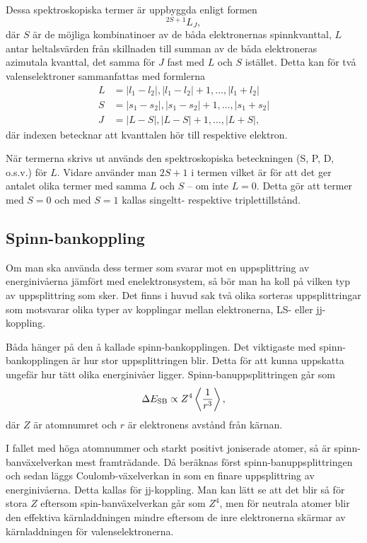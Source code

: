 \documentclass[11pt,a4paper]{article}
\begin{document}
Dessa spektroskopiska termer är uppbyggda enligt formen \cite{Bransden}
\[
^{2S+1}L_J,
\]
där $S$ är de möjliga kombinatinoer av de båda elektronernas
spinnkvanttal, $L$ antar heltalsvärden från skillnaden till summan av
de båda elektroneras azimutala kvanttal, det samma för $J$ fast med
$L$ och $S$ istället. Detta kan för två valenselektroner sammanfattas
med formlerna \cite{Bransden}
\begin{equation*}
\begin{aligned}
L &= |l_1-l_2|, |l_1- l_2|+1, \ldots, |l_1+l_2|\\
S &= |s_1-s_2|, |s_1- s_2|+1, \ldots, |s_1+s_2|\\
J &= |L-S|, |L-S| +1, \ldots, |L+S|,
\end{aligned}
\end{equation*}
där indexen betecknar att kvanttalen hör till respektive elektron.

När termerna skrivs ut används den spektroskopiska beteckningen (S, P,
D, o.s.v.) för $L$. Vidare använder man $2S+1$ i termen vilket är för
att det ger antalet olika termer med samma $L$ och $S$ -- om inte
$L=0$. Detta gör att termer med $S=0$ och med $S=1$ kallas singeltt-
respektive triplettillstånd. 

\subsection{Spinn-bankoppling}\label{sec:LS}
Om man ska använda dess termer som svarar mot en uppsplittring av energinivåerna
jämfört med enelektronsystem, så bör man ha koll på vilken typ av uppsplittring
som sker. Det finns i huvud sak två olika sorteras uppsplittringar som motsvarar
olika typer av kopplingar mellan elektronerna, LS- eller jj-koppling. 

Båda hänger på den å kallade spinn-bankopplingen. Det viktigaste med
spinn-bankopplingen är hur stor uppsplittringen blir. Detta för att kunna
uppskatta ungefär hur tätt olika energinivåer ligger. Spinn-banuppsplittringen
går som\cite{Bransden} 
\[
\Delta E_\text{SB} \propto Z^4 \ev{\frac{1}{r^3}},
\]
där $Z$ är atomnumret och $r$ är elektronens avstånd från kärnan.

I fallet med höga atomnummer och starkt positivt joniserade atomer, så är
spinn-banväxelverkan mest framträdande. Då beräknas först
spinn-banuppsplittringen och sedan läggs Coulomb-växelverkan in som en
finare uppsplittring av energinivåerna. Detta kallas för
jj-koppling. Man kan lätt se att det blir så för stora $Z$ eftersom
spin-banväxelverkan går som $Z^4$, men för neutrala atomer blir den
effektiva kärnladdningen mindre eftersom de inre elektronerna skärmar
av kärnladdningen för valenselektronerna. 
\end{document}
